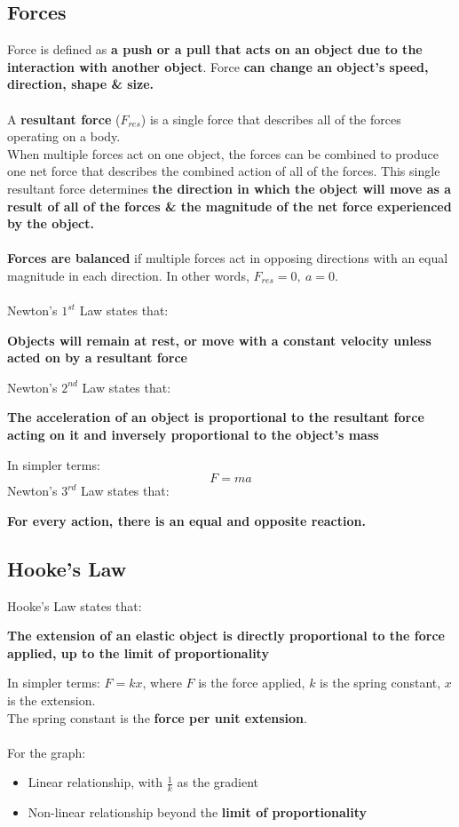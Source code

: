 \documentclass[a4paper,12pt]{article}
\begin{document}
\subsection{Forces}
Force is defined as \textbf{a push or a pull that acts on an object due to the interaction with another object}. Force \textbf{can change an object's speed, direction, shape \& size.} \\\\
A \textbf{resultant force} (\(F_{res}\)) is a single force that describes all of the forces operating on a body. \\
When multiple forces act on one object, the forces can be combined to produce one net force that describes the combined action of all of the forces.
This single resultant force determines \textbf{the direction in which the object will move as a result of all of the forces \& the magnitude of the net force experienced by the object.}\\\\
\textbf{Forces are balanced} if multiple forces act in opposing directions with an equal magnitude in each direction. In other words, \(F_{res}=0,\ a=0\).\\\\
Newton's \(1^{st}\) Law states that:
\begin{center}
\textbf{Objects will remain at rest, or move with a constant velocity unless acted on by a resultant force}\\
\end{center}
Newton's \(2^{nd}\) Law states that:
\begin{center}
\textbf{The acceleration of an object is proportional to the resultant force acting on it and inversely proportional to the object's mass}
\end{center}
In simpler terms:
\[F=ma\]
Newton's \(3^{rd}\) Law states that:
\begin{center}
\textbf{For every action, there is an equal and opposite reaction.}
\end{center}
\subsection{Hooke's Law}
Hooke's Law states that:
\begin{center}
\textbf{The extension of an elastic object is directly proportional to the force applied, up to the limit of proportionality}
\end{center}
In simpler terms:
\(F=kx\), where \(F\) is the force applied, \(k\) is the spring constant, \(x\) is the extension. \\
The spring constant is the \textbf{force per unit extension}.\\\\
For the graph:
\begin{itemize}
\item Linear relationship, with \(\frac{1}{k}\) as the gradient
\item Non-linear relationship beyond the \textbf{limit of proportionality}
\end{itemize}
\end{document}
